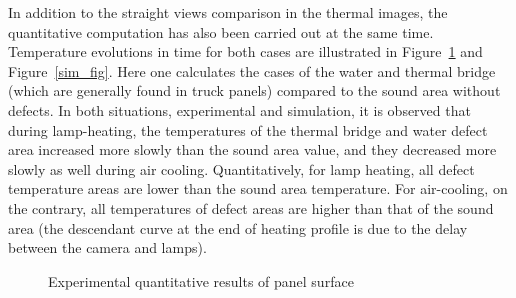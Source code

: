 In addition to the straight views comparison in the thermal images, the quantitative computation has also been carried out at the same time. Temperature evolutions in time for both cases are illustrated in Figure~\ref{exp_fig} and Figure~\ref{sim_fig}. Here one calculates the cases of the water and thermal bridge (which are generally found in truck panels) compared to the sound area without defects. In both situations, experimental and simulation, it is observed that during lamp-heating, the temperatures of the thermal bridge and water defect area increased more slowly than the sound area value, and they decreased more slowly as well during air cooling. Quantitatively, for lamp heating, all defect temperature areas are lower than the sound area temperature. For air-cooling, on the contrary, all temperatures of defect areas are higher than that of the sound area (the descendant curve at the end of heating profile is due to the delay between the camera and lamps).  
\begin{figure}
    \hspace{-20pt}
    \hspace{-12pt}
    \caption{Experimental quantitative results of panel surface}
    \label{exp_fig}
\end{figure}

